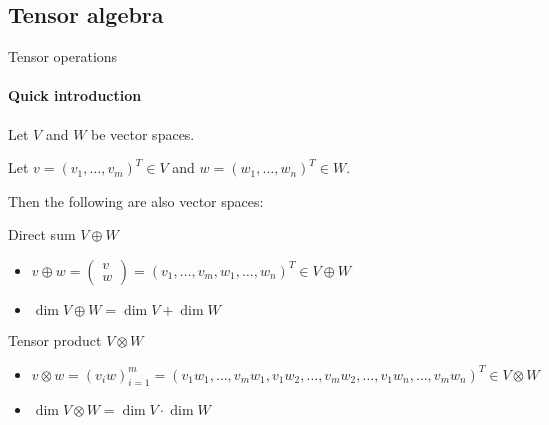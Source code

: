 \documentclass[handout, 10pt]{beamer}
\begin{document}
	\subsection{Tensor algebra}
	
	\begin{frame}{Tensor operations}
		\framesubtitle{Quick introduction}
		
		Let $V$ and $W$ be vector spaces.
		
		Let $v = (v_1, \dots, v_m)^T \in V$ and $w = (w_1, \dots, w_n)^T \in W$. 
		
		Then the following are also vector spaces:
		
		\vfill
		
		\begin{block}{Direct sum $V \oplus W$}
			\begin{itemize}
				\item $v \oplus w = \begin{pmatrix}
					v \\ w
				\end{pmatrix} = (v_1, \dots, v_m, w_1, \dots, w_n)^T \in V \oplus W$
				\item $\dim V \oplus W = \dim V + \dim W$
			\end{itemize}
		\end{block}
		\vfill
		\begin{block}{Tensor product $V \otimes W$}
			\begin{itemize}
				\item $v \otimes w = (v_iw)_{i=1}^{m} = (v_1 w_1, \dots, v_m w_1, v_1 w_2, \dots, v_m w_2, \dots, v_1 w_n, \dots, v_m w_n)^T \in V \otimes W$
				\item $\dim V \otimes W = \dim V \cdot \dim W$
			\end{itemize}
		\end{block}		
	\end{frame}
	
\end{document}
